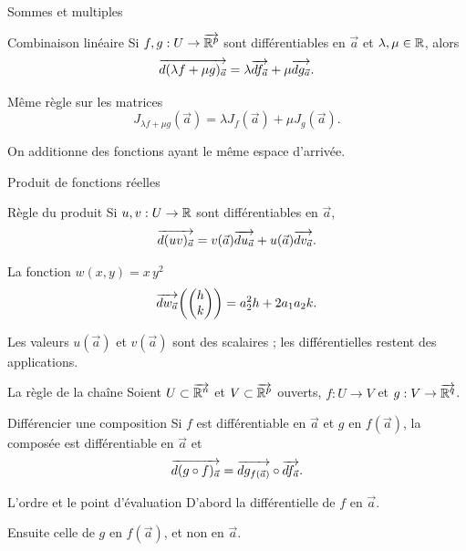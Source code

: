 \begin{frame}[t]{Sommes et multiples}
\coursanalyse
\begin{theoreme}{Combinaison linéaire}
Si $f,g:U\to\overrightarrow{\mathbb R^{p}}$ sont différentiables en $\vec a$ et $\lambda,\mu\in\mathbb R$, alors
\[\overrightarrow{d(\lambda f+\mu g)_{\vec a}}=\lambda\overrightarrow{df_{\vec a}}+\mu\overrightarrow{dg_{\vec a}}.\]
\end{theoreme}
\begin{cours}{Même règle sur les matrices}
\[J_{\lambda f+\mu g}(\vec a)=\lambda J_f(\vec a)+\mu J_g(\vec a).\]
\end{cours}
\vfill On additionne des fonctions ayant le même espace d'arrivée.
\end{frame}

\begin{frame}[t]{Produit de fonctions réelles}
\coursanalyse
\begin{theoreme}{Règle du produit}
Si $u,v:U\to\mathbb R$ sont différentiables en $\vec a$,
\[\overrightarrow{d(uv)_{\vec a}}=v(\vec a)\overrightarrow{du_{\vec a}}+u(\vec a)\overrightarrow{dv_{\vec a}}.\]
\end{theoreme}
\begin{exemple}{La fonction $w(x,y)=x\,y^2$}
\[\overrightarrow{dw_{\vec a}}\!\left(\begin{pmatrix}h\\k\end{pmatrix}\right)=a_2^2h+2a_1a_2k.\]
\end{exemple}
\vfill Les valeurs $u(\vec a)$ et $v(\vec a)$ sont des scalaires ; les différentielles restent des applications.
\end{frame}

\begin{frame}[t]{La règle de la chaîne}
\coursanalyse
Soient $U\subset\overrightarrow{\mathbb R^{n}}$ et $V\subset\overrightarrow{\mathbb R^{p}}$ ouverts, $f:U\to V$ et $g:V\to\overrightarrow{\mathbb R^{q}}$.
\begin{theoreme}{Différencier une composition}
Si $f$ est différentiable en $\vec a$ et $g$ en $f(\vec a)$, la composée est différentiable en $\vec a$ et
\[\overrightarrow{d(g\circ f)_{\vec a}}=\overrightarrow{dg_{f(\vec a)}}\circ\overrightarrow{df_{\vec a}}.\]
\end{theoreme}
\begin{resultat}{L'ordre et le point d'évaluation}
D'abord la différentielle de $f$ en $\vec a$.

\medskip
Ensuite celle de $g$ en \textbf{$f(\vec a)$}, et non en $\vec a$.
\end{resultat}
\end{frame}

